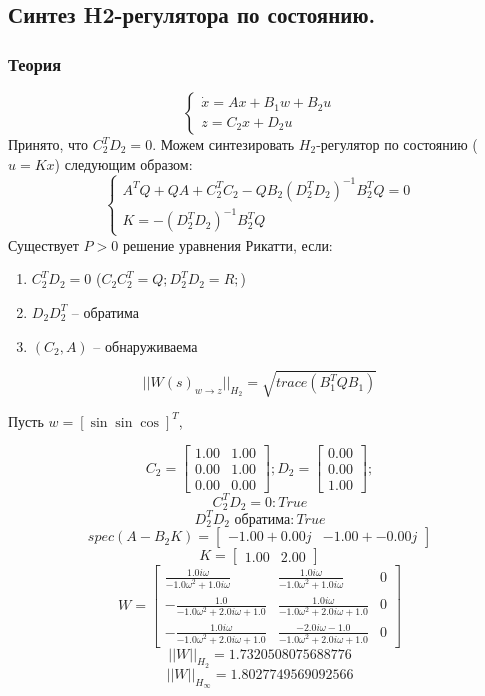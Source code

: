 \subsection{Синтез H2-регулятора по состоянию.}
\subsubsection{Теория}
\[
        \begin{cases}
                \dot{x} = A x + B_1 w + B_2 u \\
                z = C_2x + D_2 u  
        \end{cases}
\]
Принято, что \(C_2^T D_2 = 0\).
Можем синтезировать $H_2$-регулятор по состоянию ($u=Kx$) следующим образом:
\[
    \begin{cases}
        A^TQ + QA + C_2^TC_2 - QB_2(D_2^TD_2)^{-1}B_2^TQ=0 \\
        K = -(D_2^TD_2)^{-1}B_2^TQ
    \end{cases}
\]
Существует \(P > 0\) решение уравнения Рикатти, если:
\begin{enumerate}
  \item \(C_2^TD_2 = 0\) (\(C_2C_2^T = Q; D_2^TD_2 = R;\))
  \item \(D_2D_2^T\) -- обратима
  \item \((C_2, A)\) -- обнаруживаема
\end{enumerate}
\[||W(s)_{w \rightarrow z}||_{H_2} = \sqrt{trace(B_1^T Q B_1)}\]

Пусть \(w = [\sin \sin \cos]^T\), 

\[C_2 = \begin{bmatrix}
  1.00 &  1.00\\
  0.00 &  1.00\\
  0.00 &  0.00
\end{bmatrix}; D_2 = \begin{bmatrix}
  0.00\\
  0.00\\
  1.00
\end{bmatrix};\]
\[C_2^T D_2 = 0: True\]
\[D_2^T D_2 \text{ обратима}: True\]
\[spec(A-B_2 K) = \begin{bmatrix}
 -1.00 + 0.00j & -1.00 + -0.00j
\end{bmatrix}\]
\[K = \begin{bmatrix}
  1.00 &  2.00
\end{bmatrix}\]
\[ W = \left[\begin{matrix}\frac{1.0 i \omega}{- 1.0 \omega^{2} + 1.0 i \omega} & \frac{1.0 i \omega}{- 1.0 \omega^{2} + 1.0 i \omega} & 0\\- \frac{1.0}{- 1.0 \omega^{2} + 2.0 i \omega + 1.0} & \frac{1.0 i \omega}{- 1.0 \omega^{2} + 2.0 i \omega + 1.0} & 0\\- \frac{1.0 i \omega}{- 1.0 \omega^{2} + 2.0 i \omega + 1.0} & \frac{- 2.0 i \omega - 1.0}{- 1.0 \omega^{2} + 2.0 i \omega + 1.0} & 0\end{matrix}\right]\]
\[||W||_{H_2} = 1.7320508075688776\]
\[||W||_{H_\infty} = 1.8027749569092566 \]

